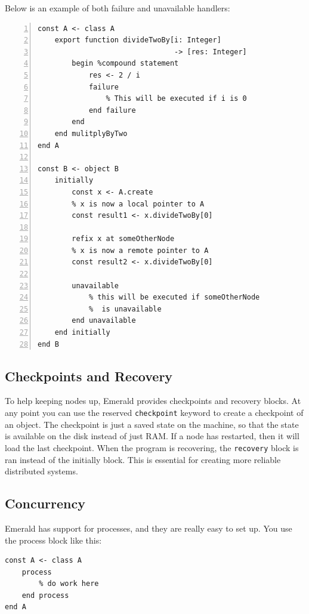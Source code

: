 Below is an example of both failure and unavailable handlers:
\begin{lstlisting}[language=emerald, numbers=left]
const A <- class A
    export function divideTwoBy[i: Integer] 
                                -> [res: Integer]
        begin %compound statement
            res <- 2 / i
            failure
                % This will be executed if i is 0
            end failure
        end
    end mulitplyByTwo
end A

const B <- object B
    initially
        const x <- A.create
        % x is now a local pointer to A
        const result1 <- x.divideTwoBy[0]
        
        refix x at someOtherNode
        % x is now a remote pointer to A
        const result2 <- x.divideTwoBy[0]
        
        unavailable
            % this will be executed if someOtherNode
            %  is unavailable
        end unavailable
    end initially
end B
\end{lstlisting}






\subsection{Checkpoints and Recovery}
To help keeping nodes up, Emerald provides checkpoints and recovery blocks. At any point you can use the reserved \verb|checkpoint| keyword to create a checkpoint of an object. The checkpoint is just a saved state on the machine, so that the state is available on the disk instead of just RAM. If a node has restarted, then it will load the last checkpoint. When the program is recovering, the \verb|recovery| block is ran instead of the initially block. This is essential for creating more reliable distributed systems.



\subsection{Concurrency}
Emerald has support for processes, and they are really easy to set up. You use the process block like this:
\begin{lstlisting}[language=emerald]
const A <- class A
    process
        % do work here
    end process
end A
\end{lstlisting}

